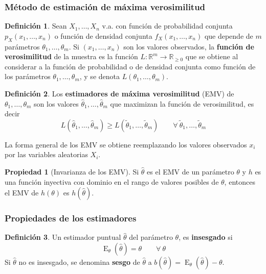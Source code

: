 \documentclass[11pt]{article}
\theoremstyle{plain}
\theoremstyle{definition}
\newtheorem*{defi}{Definición}
\newtheorem*{prop}{Propiedad}
\theoremstyle{remark}
\newcommand{\deft}[1]{\textbf{#1}}  %
\newcommand{\esp}[0]{\ensuremath{\operatorname{E}}}  %
\newcommand{\foralle}{\ensuremath{\forall \ }}  %
\begin{document}
    \subsubsection{Método de estimación de máxima verosimilitud}

      \begin{defi}
        Sean $X_1, \dots, X_n$ v.a. con función de probabilidad conjunta $p_X(x_1,\dots,x_n)$ o función de densidad conjunta $f_X(x_1,\dots,x_n)$ que depende de $m$ parámetros $\theta_1, \dots, \theta_m$. Si $(x_1, \dots, x_n)$ son los valores observados, la \deft{función de verosimilitud} de la muestra es la función $L : \mathbb{R}^m \to \mathbb{R}_{\geq 0}$ que se obtiene al considerar a la función de probabilidad o de densidad conjunta como función de los parámetros $\theta_1, \dots, \theta_m$, y se denota $L(\theta_1,\dots,\theta_m)$.
      \end{defi}

      \begin{defi}
        Los \deft{estimadores de máxima verosimilitud} (EMV) de $\theta_1, \dots, \theta_m$ son los valores $\hat \theta_1, \dots, \hat \theta_m$ que maximizan la función de verosimilitud, es decir
        \[ L(\hat \theta_1, \dots, \hat \theta_m) \geq L(\tilde\theta_1, \dots, \tilde\theta_m) \qquad \foralle \tilde\theta_1, \dots, \tilde\theta_m \]

        La forma general de los EMV se obtiene reemplazando los valores observados $x_i$ por las variables aleatorias $X_i$.
      \end{defi}

      \begin{prop}[Invarianza de los EMV]
        Si $\hat \theta$ es el EMV de un parámetro $\theta$ y $h$ es una función inyectiva con dominio en el rango de valores posibles de $\theta$, entonces el EMV de $h(\theta)$ es $h(\hat \theta)$.
      \end{prop}

    \subsubsection{Propiedades de los estimadores}

      \begin{defi}
        Un estimador puntual $\hat \theta$ del parámetro $\theta$, es \deft{insesgado} si
        \[ \esp_\theta(\hat \theta) = \theta \qquad \foralle \theta \]
        Si $\hat \theta$ no es insesgado, se denomina \deft{sesgo} de $\hat \theta$ a $b(\hat \theta) = \esp_\theta(\hat \theta) - \theta$.
      \end{defi}
\end{document}
